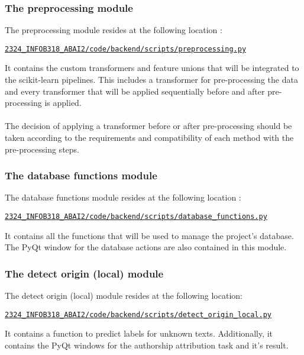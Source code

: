 \subsubsection{The preprocessing module}
The preprocessing module resides at the following location :
\begin{codebox}
    \large\href{https://github.com/UNamurCSFaculty/2324_INFOB318_ABAI2/blob/main/code/backend/scripts/preprocessing.py}{\texttt{2324\_INFOB318\_ABAI2/code/backend/scripts/preprocessing.py}}
\end{codebox}
It contains the custom transformers and feature unions that will be integrated to the scikit-learn pipelines. This includes a transformer for pre-processing the data and every transformer that will be applied sequentially before and after pre-processing is applied.\\\\ The decision of applying a transformer before or after pre-processing should be taken according to the requirements and compatibility of each method with the pre-processing steps.

\subsubsection{The database functions module}
The database functions module resides at the following location :
\begin{codebox}
    \large\href{https://github.com/UNamurCSFaculty/2324_INFOB318_ABAI2/blob/main/code/backend/scripts/database_functions.py}{\texttt{2324\_INFOB318\_ABAI2/code/backend/scripts/database\_functions.py}}
\end{codebox}
It contains all the functions that will be used to manage the project's database. The PyQt window for the database actions are also contained in this module. 

\subsubsection{The detect origin (local) module}
The detect origin (local) module resides at the following location:
\begin{codebox}
    \large\href{https://github.com/UNamurCSFaculty/2324_INFOB318_ABAI2/blob/main/code/backend/scripts/detect_origin_local.py}{\texttt{2324\_INFOB318\_ABAI2/code/backend/scripts/detect\_origin\_local.py}}
\end{codebox}
It contains a function to predict labels for unknown texts. Additionally, it contains the PyQt windows for the authorship attribution task and it's result.
\clearpage

